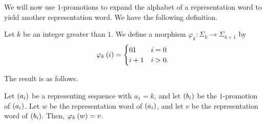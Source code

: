 \documentclass[english,12pt]{article}
\newcommand{\seq}{\p}
\begin{document}
We will now use $1$-promotions to expand the alphabet of a representation word to yield another representation word.  We have the following definition.
\begin{defin}\label{def:promorph}
Let $k$ be an integer greater than $1$.  We define a morphism $\varphi_k:\Sigma_k\to\Sigma_{k+1}$ by
\[
\varphi_k\left(i\right)=\begin{cases}
01 & i=0\\
i+1 & i > 0.
\end{cases}
\]
\end{defin}
The result is as follows.
\begin{theorem}\label{thm:tracepromo}
Let $\seq{a_i}$ be a representing sequence with $a_1=k$, and let $\seq{b_i}$ be the $1$-promotion of $\seq{a_i}$.  Let $w$ be the representation word of $\seq{a_i}$, and let $v$ be the representation word of $\seq{b_i}$.  Then, $\varphi_k\left(w\right)=v$.
\end{theorem}
\end{document}
